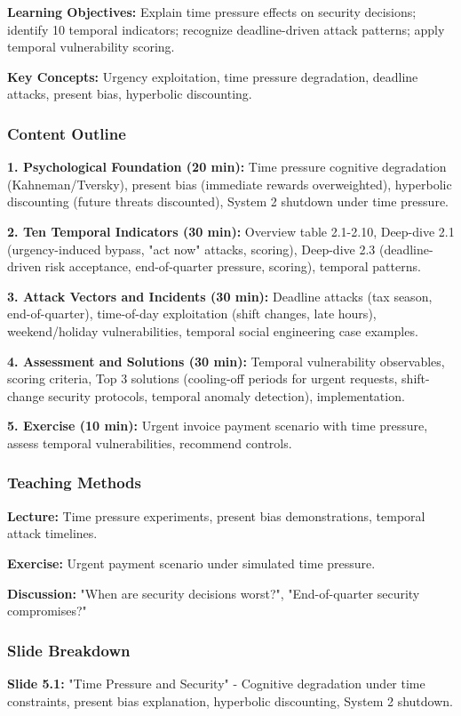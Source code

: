 \documentclass[11pt,a4paper]{article}
\begin{document}
\textbf{Learning Objectives:} Explain time pressure effects on security decisions; identify 10 temporal indicators; recognize deadline-driven attack patterns; apply temporal vulnerability scoring.

\textbf{Key Concepts:} Urgency exploitation, time pressure degradation, deadline attacks, present bias, hyperbolic discounting.

\subsubsection{Content Outline}
\textbf{1. Psychological Foundation (20 min):} Time pressure cognitive degradation (Kahneman/Tversky), present bias (immediate rewards overweighted), hyperbolic discounting (future threats discounted), System 2 shutdown under time pressure.

\textbf{2. Ten Temporal Indicators (30 min):} Overview table 2.1-2.10, Deep-dive 2.1 (urgency-induced bypass, "act now" attacks, scoring), Deep-dive 2.3 (deadline-driven risk acceptance, end-of-quarter pressure, scoring), temporal patterns.

\textbf{3. Attack Vectors and Incidents (30 min):} Deadline attacks (tax season, end-of-quarter), time-of-day exploitation (shift changes, late hours), weekend/holiday vulnerabilities, temporal social engineering case examples.

\textbf{4. Assessment and Solutions (30 min):} Temporal vulnerability observables, scoring criteria, Top 3 solutions (cooling-off periods for urgent requests, shift-change security protocols, temporal anomaly detection), implementation.

\textbf{5. Exercise (10 min):} Urgent invoice payment scenario with time pressure, assess temporal vulnerabilities, recommend controls.

\subsubsection{Teaching Methods}
\textbf{Lecture:} Time pressure experiments, present bias demonstrations, temporal attack timelines.

\textbf{Exercise:} Urgent payment scenario under simulated time pressure.

\textbf{Discussion:} "When are security decisions worst?", "End-of-quarter security compromises?"

\subsubsection{Slide Breakdown}
\textbf{Slide 5.1:} "Time Pressure and Security" - Cognitive degradation under time constraints, present bias explanation, hyperbolic discounting, System 2 shutdown.
\end{document}
